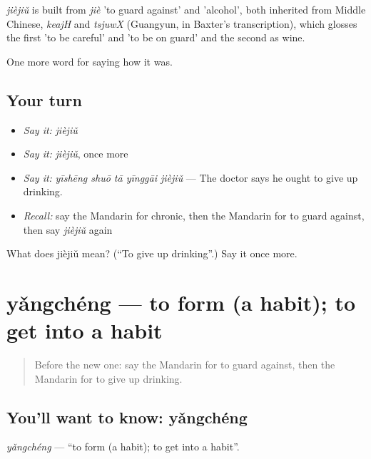 \begin{cousinweb}
\emph{jièjiǔ} is built from \emph{jiè} 'to guard against' and  'alcohol', both inherited from Middle Chinese, \emph{keajH} and \emph{tsjuwX} (Guangyun, in Baxter's transcription), which glosses the first 'to be careful' and 'to be on guard' and the second as wine.
\end{cousinweb}

\begin{grammarlens}[title={What you've built}]
One more word for saying how it was.
\end{grammarlens}

\subsection*{Your turn}
\begin{itemize}
\raggedright
  \item \emph{Say it:} \emph{jièjiǔ}
  \item \emph{Say it:} \emph{jièjiǔ}, once more
  \item \emph{Say it:} \emph{yīshēng shuō tā yīnggāi jièjiǔ} — The doctor says he ought to give up drinking.
  \item \emph{Recall:} say the Mandarin for chronic, then the Mandarin for to guard against, then say \emph{jièjiǔ} again
\end{itemize}

\begin{tcolorbox}[breakable,colback=teal!4,colframe=teal!35!black,title={Before you move on}]
What does jièjiǔ mean? (\textquotedblleft{}To give up drinking\textquotedblright{}.) Say it once more.
\end{tcolorbox}
\section[yǎngchéng]{yǎngchéng — to form (a habit); to get into a habit}

\label{lesson:ZH-C484-yangcheng}



\begin{quote}
Before the new one: say the Mandarin for to guard against, then the Mandarin for to give up drinking.
\end{quote}

\subsection*{You'll want to know: yǎngchéng}
\emph{yǎngchéng} — \textquotedblleft{}to form (a habit); to get into a habit\textquotedblright{}.

